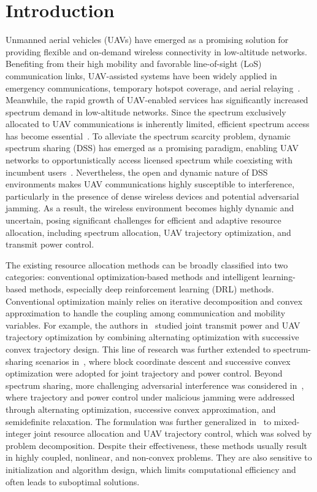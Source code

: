 \documentclass[conference]{IEEEtran}
\begin{document}
\section{Introduction}
Unmanned aerial vehicles (UAVs) have emerged as a promising solution for providing flexible and 
on-demand wireless connectivity in low-altitude networks. 
Benefiting from their high mobility and favorable line-of-sight (LoS) communication links, 
UAV-assisted systems have been widely applied in emergency communications, temporary hotspot coverage, 
and aerial relaying~\cite{10054151,9155283,9750059}. 
Meanwhile, the rapid growth of UAV-enabled services has significantly increased spectrum demand in low-altitude networks. 
Since the spectrum exclusively allocated to UAV communications is inherently limited, efficient spectrum access has become essential~\cite{11418311}.
To alleviate the spectrum scarcity problem, dynamic spectrum sharing (DSS) has emerged as a promising paradigm, 
enabling UAV networks to opportunistically access licensed spectrum while coexisting with incumbent users~\cite{11081858}. 
Nevertheless, the open and dynamic nature of DSS environments makes UAV communications highly susceptible to interference, 
particularly in the presence of dense wireless devices and potential adversarial jamming. 
As a result, the wireless environment becomes highly dynamic and uncertain, 
posing significant challenges for efficient and adaptive resource allocation, 
including spectrum allocation, UAV trajectory optimization, and transmit power control.

The existing resource allocation methods can be broadly classified into two categories: conventional optimization-based methods and intelligent learning-based methods, 
especially deep reinforcement learning (DRL) methods. 
Conventional optimization mainly relies on iterative decomposition and convex approximation to handle the coupling among communication and mobility variables. 
For example, the authors in~\cite{7572068} studied joint transmit power and UAV trajectory optimization by combining alternating optimization with successive convex trajectory design. 
This line of research was further extended to spectrum-sharing scenarios in~\cite{8902014}, where block coordinate descent and successive convex optimization were adopted for joint trajectory and power control. 
Beyond spectrum sharing, more challenging adversarial interference was considered in~\cite{9810528}, where trajectory and power control under malicious jamming were addressed through alternating optimization, successive convex approximation, and semidefinite relaxation. 
The formulation was further generalized in~\cite{10176326} to mixed-integer joint resource allocation and UAV trajectory control, which was solved by problem decomposition. 
Despite their effectiveness, these methods usually result in highly coupled, nonlinear, and non-convex problems. 
They are also sensitive to initialization and algorithm design, which limits computational efficiency and often leads to suboptimal solutions.
\end{document}
